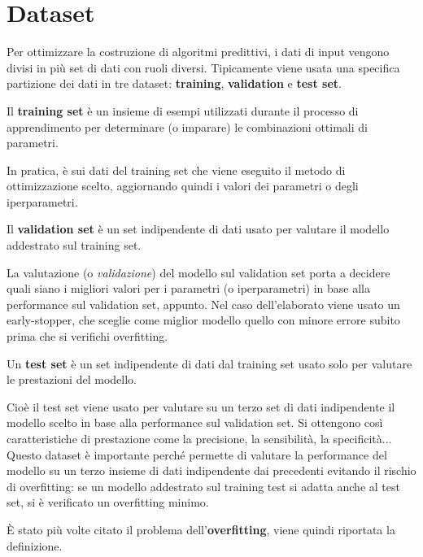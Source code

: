 \section{Dataset}\label{dataset}

Per ottimizzare la costruzione di algoritmi predittivi, i dati di input vengono divisi in più set di dati con ruoli diversi. Tipicamente viene usata una specifica partizione dei dati in tre dataset: \textbf{training}, \textbf{validation} e \textbf{test set}.


\begin{defi}
Il \textbf{training set} è un insieme di esempi utilizzati durante il processo di apprendimento per determinare (o imparare) le combinazioni ottimali di parametri.
\end{defi}

In pratica, è sui dati del training set che viene eseguito il metodo di ottimizzazione scelto, aggiornando quindi i valori dei parametri o degli iperparametri.

\begin{defi}
Il \textbf{validation set} è un set indipendente di dati usato per valutare il modello addestrato sul training set.
\end{defi}
La valutazione (o \textit{validazione}) del modello sul validation set porta a decidere quali siano i migliori valori per i parametri (o iperparametri) in base alla performance sul validation set, appunto. Nel caso dell'elaborato viene usato un early-stopper, che sceglie come miglior modello quello con minore errore subito prima che si verifichi overfitting.

\begin{defi}
Un \textbf{test set} è un set indipendente di dati dal training set  usato solo per valutare le prestazioni del modello.
\end{defi}

\newpage

Cioè il test set viene usato per valutare su un terzo set di dati indipendente il modello scelto in base alla performance sul validation set. Si ottengono così caratteristiche di prestazione come la precisione, la sensibilità, la specificità... Questo dataset è importante perché permette di valutare la performance del modello su un terzo insieme di dati indipendente dai precedenti evitando il rischio di overfitting: se un modello addestrato sul training test si adatta anche al test set, si è verificato un overfitting minimo.

È stato più volte citato il problema dell'\textbf{overfitting}, viene quindi riportata la definizione.

